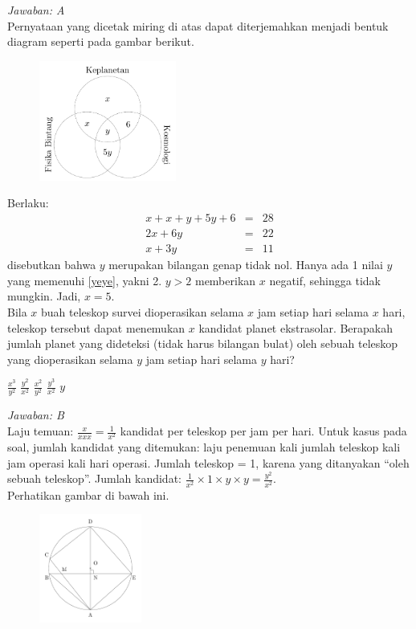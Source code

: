 \documentclass[11pt,fleqn]{exam}
\begin{document}
\begin{questions}
\textit{Jawaban: A}\\
Pernyataan yang dicetak miring di atas dapat diterjemahkan menjadi bentuk diagram seperti pada gambar berikut.
\begin{figure}[H]
\centering
\includegraphics[width=0.4\textwidth]{gambar/himpunan.pdf}
\end{figure}

\noindent Berlaku:
\begin{eqnarray}
x+x+y+5y+6&=&28 \nonumber \\
2x+6y&=&22 \nonumber \\
x+3y&=&11 \label{yeye}
\end{eqnarray}
\noindent disebutkan bahwa $y$ merupakan bilangan genap tidak nol. Hanya ada 1 nilai $y$ yang memenuhi \autoref{yeye}, yakni 2. $y>2$ memberikan $x$ negatif, sehingga tidak mungkin. Jadi, $x=5$.\\

\question Bila $x$ buah teleskop survei dioperasikan selama $x$ jam setiap hari selama $x$ hari, teleskop tersebut dapat menemukan $x$ kandidat planet ekstrasolar. Berapakah jumlah planet yang dideteksi (tidak harus bilangan bulat) oleh sebuah teleskop yang dioperasikan selama $y$ jam setiap hari selama $y$ hari?
\begin{choices}
\choice $\frac{x^3}{y^2}$
\choice $\frac{y^2}{x^2}$
\choice $\frac{x^2}{y^2}$
\choice $\frac{y^3}{x^2}$
\choice $y$
\end{choices}

\textit{Jawaban: B}\\
Laju temuan: $\frac{x}{xxx}=\frac{1}{x^2}$ kandidat per teleskop per jam per hari. Untuk kasus pada soal, jumlah kandidat yang ditemukan: laju penemuan kali jumlah teleskop kali jam operasi kali hari operasi. Jumlah teleskop = 1, karena yang ditanyakan ``oleh sebuah teleskop''. Jumlah kandidat: $\frac{1}{x^2}\times 1\times y\times y=\frac{y^2}{x^2}$.\\


\question Perhatikan gambar di bawah ini.
\begin{figure}[H]
\centering
\includegraphics[width=0.3\textwidth]{gambar/lingk-seg4.pdf}
\end{figure}


\end{questions}
\end{document}
